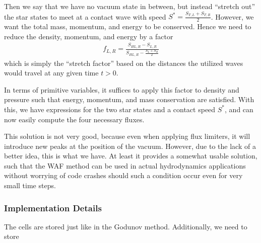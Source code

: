 \begin{enumerate}
			Then we say that we have no vacuum state in between, but instead ``stretch out'' the star states to meet at a contact wave with speed $S^* = \frac{S_{T,L} + S_{T,R}}{2}$.
			However, we want the total mass, momentum, and energy to be conserved.
			Hence we need to reduce the density, momentum, and energy by a factor
			\begin{align*}
				f_{L,R} = \frac{S_{HL,R} - S_{L,R}}{S_{HL,R} - \frac{S_L + S_R}{2}}
			\end{align*}
			which is simply the ``stretch factor'' based on the distances the utilized waves would travel at any given time $t > 0 $.
			
			In terms of primitive variables, it suffices to apply this factor to density and pressure such that energy, momentum, and mass conservation are satisfied.
			With this, we have expressions for the two star states and a contact speed $S^*$, and can now easily compute the four necessary fluxes.
			
			This solution is not very good, because even when applying flux limiters, it will introduce new peaks at the position of the vacuum.
			However, due to the lack of a better idea, this is what we have.
			At least it provides a somewhat usable solution, such that the WAF method can be used in actual hydrodynamics applications without worrying of code crashes should such a condition occur even for very small time steps.
			

\end{enumerate}
























\subsubsection{Implementation Details}\label{chap:hydro-WAF-details}



The cells are stored just like in the Godunov method.
Additionally, we need to store

